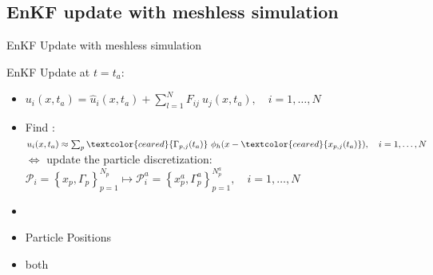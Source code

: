 \documentclass[aspectratio=169]{beamer} %
\begin{document}
\subsection{EnKF update with meshless simulation}
\begin{frame}{EnKF Update with meshless simulation}
    \begin{block}{EnKF Update at $t=t_a$:}
        \begin{itemize}
            \item $u_i(x, t_a) = \hat u_i(x, t_a) + \sum_{l=1}^{N} F_{ij}~\hat u_j(x, t_a), \quad i = 1, \dots, N$ \\
            \item<2-> Find : $u_i(x, t_a) \approx \sum_p \textcolor{ceared}{\Gamma_{p, j}(t_a)}~\phi_h (x - \textcolor{ceared}{x_{p, j}(t_a)}), \quad i = 1, \dots, N$\\
                $\Leftrightarrow$ update the particle discretization: $\mathcal P_i = \left\{x_p, \Gamma_p\right\}_{p=1}^{N_p} \mapsto \mathcal P_i^a = \left\{x_p^a, \Gamma^a_p\right\}_{p=1}^{N^a_p}, \quad i = 1, \dots, N$
        \end{itemize}
    \end{block}
    \vfill

    \begin{itemize}
        \item<3->   
        \item<3-> Particle Positions
        \item<3-> both
    \end{itemize}
\end{frame}
\end{document}
